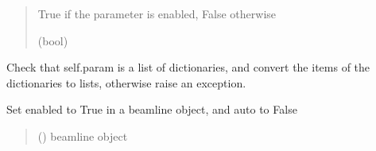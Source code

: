 \documentclass[letterpaper,10pt,english]{sphinxmanual}
\begin{document}
\begin{fulllineitems}
\begin{fulllineitems}
\begin{quote}
\begin{description}
\sphinxAtStartPar
True if the parameter is enabled, False otherwise

\sphinxAtStartPar
(bool)

\end{description}\end{quote}

\end{fulllineitems}


\begin{fulllineitems}
\label{\detokenize{index:raypyng.simulate.SimulationParams._check_param}}
\pysigstartsignatures
{}
\pysigstopsignatures
\sphinxAtStartPar
Check that self.param is a list of dictionaries, and convert the
items of the dictionaries to lists, otherwise raise an exception.

\end{fulllineitems}


\begin{fulllineitems}
\label{\detokenize{index:raypyng.simulate.SimulationParams._enable_param}}
\pysigstartsignatures
{}
\pysigstopsignatures
\sphinxAtStartPar
Set enabled to True in a beamline object, and auto to False
\begin{quote}\begin{description}
\sphinxAtStartPar
{} () \textendash{} beamline object

\end{description}\end{quote}

\end{fulllineitems}



\end{fulllineitems}
\end{document}
